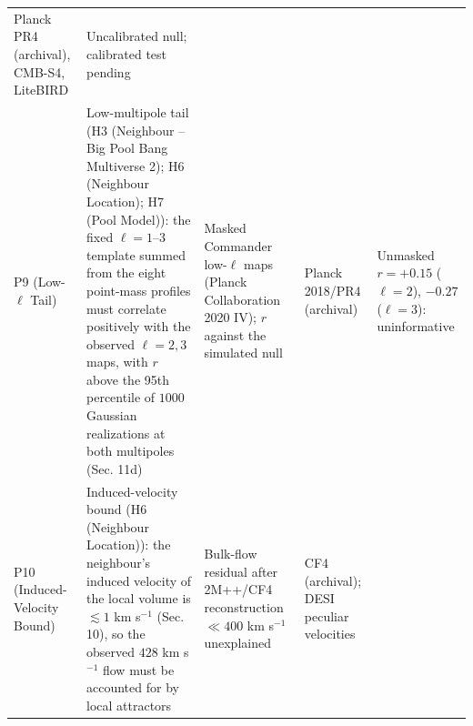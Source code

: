 \documentclass[
  11pt,
]{article}
\begin{document}
\begin{longtable}[]{@{}lllll@{}}
\begin{minipage}[t]{0.19\columnwidth}
Planck PR4 (archival), CMB-S4, LiteBIRD\strut
\end{minipage} & \begin{minipage}[t]{0.19\columnwidth}\raggedright
Uncalibrated null; calibrated test pending\strut
\end{minipage}\tabularnewline
\begin{minipage}[t]{0.11\columnwidth}\raggedright
P9 (Low-\(\ell\) Tail)\strut
\end{minipage} & \begin{minipage}[t]{0.19\columnwidth}\raggedright
Low-multipole tail (H3 (Neighbour -- Big Pool Bang Multiverse 2); H6
(Neighbour Location); H7 (Pool Model)): the fixed \(\ell = 1\)--\(3\)
template summed from the eight point-mass profiles must correlate
positively with the observed \(\ell = 2, 3\) maps, with \(r\) above the
95th percentile of \(1000\) Gaussian realizations at both multipoles
(Sec. 11d)\strut
\end{minipage} & \begin{minipage}[t]{0.19\columnwidth}\raggedright
Masked Commander low-\(\ell\) maps (Planck Collaboration 2020 IV); \(r\)
against the simulated null\strut
\end{minipage} & \begin{minipage}[t]{0.19\columnwidth}\raggedright
Planck 2018/PR4 (archival)\strut
\end{minipage} & \begin{minipage}[t]{0.19\columnwidth}\raggedright
Unmasked \(r = +0.15\) (\(\ell=2\)), \(-0.27\) (\(\ell=3\)):
uninformative\strut
\end{minipage}\tabularnewline
\begin{minipage}[t]{0.11\columnwidth}\raggedright
P10 (Induced-Velocity Bound)\strut
\end{minipage} & \begin{minipage}[t]{0.19\columnwidth}\raggedright
Induced-velocity bound (H6 (Neighbour Location)): the neighbour's
induced velocity of the local volume is \(\lesssim 1\) km s\(^{-1}\)
(Sec. 10), so the observed \(428\) km s\(^{-1}\) flow must be accounted
for by local attractors\strut
\end{minipage} & \begin{minipage}[t]{0.19\columnwidth}\raggedright
Bulk-flow residual after 2M++/CF4 reconstruction \(\ll 400\) km
s\(^{-1}\) unexplained\strut
\end{minipage} & \begin{minipage}[t]{0.19\columnwidth}\raggedright
CF4 (archival); DESI peculiar velocities\strut

\end{minipage}
\end{longtable}
\end{document}
